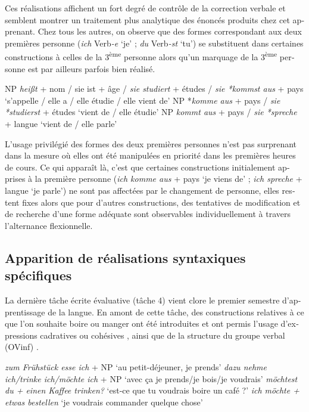 \documentclass[output=paper]{langscibook}
\begin{document}
\begin{otherlanguage}{french}
Ces réalisations affichent un fort degré de contrôle de la correction verbale et semblent montrer un traitement plus analytique des énoncés produits chez cet apprenant. Chez tous les autres, on observe que des formes correspondant aux deux premières personne (\textit{ich} Verb\textit{-e} `je' ; \textit{du} Verb\textit{-st} `tu') se substituent dans certaines constructions à celles de la 3\textsuperscript{ème} personne  alors qu’un marquage de la 3\textsuperscript{ème} personne est par ailleurs parfois bien réalisé. 

\ea%
    \label{ex:felce:9}
     \ea NP \textit{heißt} + nom / sie ist + âge / \textit{sie studiert} + études / \textit{sie *kommst aus} + pays `s’appelle / elle a / elle étudie / elle vient de'
     \ex\relax NP *\textit{komme aus} + pays / \textit{sie *studierst} + études `vient de / elle étudie'
     \ex\relax NP \textit{kommt aus} + pays / \textit{sie *spreche} + langue  `vient de / elle parle'
     \z
\z


L’usage privilégié des formes des deux premières personnes n’est pas surprenant dans la mesure où elles ont été manipulées en priorité dans les premières heures de cours. Ce qui apparaît là, c’est que certaines constructions initialement apprises à la première personne (\textit{ich komme aus} + pays `je viens de' ; \textit{ich spreche} + langue `je parle') ne sont pas affectées par le changement de personne, elles restent fixes alors que pour d’autres constructions, des tentatives de modification et de recherche d’une forme adéquate sont observables individuellement à travers l’alternance flexionnelle.

\subsection{Apparition de réalisations syntaxiques spécifiques}\label{sec:felce:6.4}\largerpage[2]

La dernière tâche écrite évaluative (tâche 4) vient clore le premier semestre d’apprentissage de la langue. En amont de cette tâche, des constructions relatives à ce que l’on souhaite boire ou manger ont été introduites et ont permis l’usage d’expressions cadratives  ou cohésives , ainsi que de la structure du groupe verbal (OVinf) .

\ea%
    \label{ex:felce:10}
    \ea \textit{zum Frühstück esse ich} + NP `au petit-déjeuner, je prends' \label{ex:felce:10a}
    \ex \textit{dazu nehme ich/trinke ich/möchte ich} + NP `avec ça je prends/je bois/je voudrais'\label{ex:felce:10b}
    \z
\ex%
    \label{ex:felce:11}
    \ea \textit{möchtest du + einen Kaffee trinken?} `est-ce que tu voudrais boire un café ?'
    \ex \textit{ich möchte + etwas bestellen} `je voudrais commander quelque chose'
    \z
\z


\end{otherlanguage}
\end{document}
